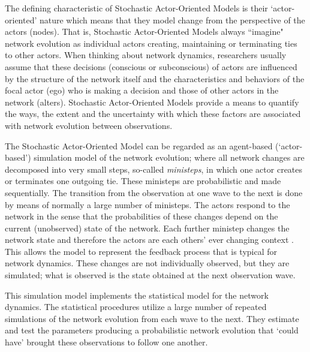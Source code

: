 \documentclass[a4paper,fleqn,11pt]{article}
\newcommand{\+}{\, + \,}
\newcommand{\SAOM}{{Stochastic Actor-Oriented Model }}
\newcommand{\saom}{{Stochastic Actor-Oriented Model}}
\begin{document}
The defining characteristic of {\saom}s
is their `actor-oriented' nature which means that they model
change from the perspective of the actors (nodes).
That is, {\saom}s always ``imagine" network evolution
as individual actors creating, maintaining or terminating ties to other actors.
When thinking about network dynamics, researchers usually assume that these
decisions (conscious or subconscious) of actors are influenced by the structure
of the network itself and the characteristics and behaviors of the focal actor
(ego) who is making a decision and those of other actors in the network (alters).
{\saom}s provide a means to quantify the ways, the
extent and the uncertainty with which these factors are associated with
network evolution between observations.

The \SAOM can be regarded as an agent-based (`actor-based') simulation
model of the network evolution; where all network changes are decomposed into
very small steps, so-called \emph{ministeps}, in which
one actor creates or terminates one outgoing tie.
These ministeps are probabilistic and made sequentially.
The transition from the observation
at one wave to the next is done by means of normally a large number of ministeps.
The actors respond to the network in the sense that the probabilities
of these changes depend on the current (unobserved) state of the network.
Each further ministep changes the network state and therefore the actors
are each others' ever changing context  \citep{Zeg94}.
This allows the model to represent the feedback process
that is typical for network dynamics. These changes are not
individually observed, but they are simulated;
what is observed is the state obtained at the next observation wave.

This simulation model implements the statistical model
for the network dynamics. The statistical procedures utilize
a large number of repeated simulations of the network evolution
from each wave to the next. They estimate and test the parameters
producing a probabilistic network evolution
that `could have' brought these observations to follow one another.
\end{document}
